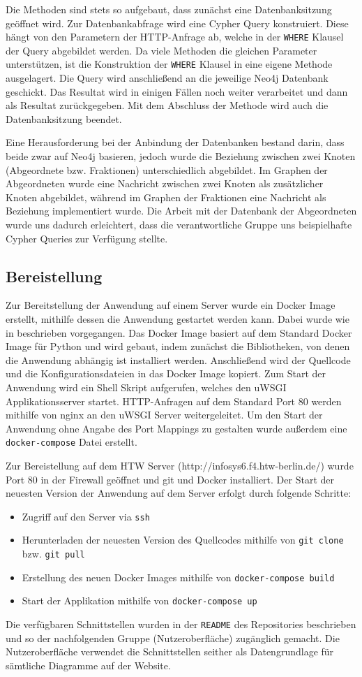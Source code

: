 Die Methoden sind stets so aufgebaut, dass zunächst eine Datenbanksitzung geöffnet wird.
Zur Datenbankabfrage wird eine Cypher Query konstruiert. Diese hängt von den Parametern der HTTP-Anfrage ab, welche in der \lstinline{WHERE} Klausel der Query abgebildet werden.
Da viele Methoden die gleichen Parameter unterstützen, ist die Konstruktion der \lstinline{WHERE} Klausel in eine eigene Methode ausgelagert.
Die Query wird anschließend an die jeweilige Neo4j Datenbank geschickt. Das Resultat wird in einigen Fällen noch weiter verarbeitet und dann als Resultat zurückgegeben.
Mit dem Abschluss der Methode wird auch die Datenbanksitzung beendet.

Eine Herausforderung bei der Anbindung der Datenbanken bestand darin, dass beide zwar auf Neo4j basieren, jedoch wurde die Beziehung zwischen zwei Knoten (Abgeordnete bzw. Fraktionen) unterschiedlich abgebildet.
Im Graphen der Abgeordneten wurde eine Nachricht zwischen zwei Knoten als zusätzlicher Knoten abgebildet, während im Graphen der Fraktionen eine Nachricht als Beziehung implementiert wurde.
Die Arbeit mit der Datenbank der Abgeordneten wurde uns dadurch erleichtert, dass die verantwortliche Gruppe uns beispielhafte Cypher Queries zur Verfügung stellte.

\subsection{Bereistellung}
Zur Bereitstellung der Anwendung auf einem Server wurde ein Docker Image erstellt, mithilfe dessen die Anwendung gestartet werden kann.
Dabei wurde wie in \cite{flask_docker} beschrieben vorgegangen.
Das Docker Image basiert auf dem Standard Docker Image für Python und wird gebaut, indem zunächst die Bibliotheken, von denen die Anwendung abhängig ist installiert werden.
Anschließend wird der Quellcode und die Konfigurationsdateien in das Docker Image kopiert.
Zum Start der Anwendung wird ein Shell Skript aufgerufen, welches den uWSGI Applikationsserver startet.
HTTP-Anfragen auf dem Standard Port 80 werden mithilfe von nginx an den uWSGI Server weitergeleitet.
Um den Start der Anwendung ohne Angabe des Port Mappings zu gestalten wurde außerdem eine \lstinline{docker-compose} Datei erstellt.


Zur Bereistellung auf dem HTW Server (http://infosys6.f4.htw-berlin.de/) wurde Port 80 in der Firewall geöffnet und git und Docker installiert.
Der Start der neuesten Version der Anwendung auf dem Server erfolgt durch folgende Schritte:
\begin{itemize}
  \item Zugriff auf den Server via \lstinline{ssh}
  \item Herunterladen der neuesten Version des Quellcodes mithilfe von \lstinline{git clone} bzw. \lstinline{git pull}
  \item Erstellung des neuen Docker Images mithilfe von \lstinline{docker-compose build}
  \item Start der Applikation mithilfe von \lstinline{docker-compose up}
\end{itemize}

Die verfügbaren Schnittstellen wurden in der \lstinline{README} des Repositories beschrieben und so der nachfolgenden Gruppe (Nutzeroberfläche) zugänglich gemacht.
Die Nutzeroberfläche verwendet die Schnittstellen seither als Datengrundlage für sämtliche Diagramme auf der Website.
